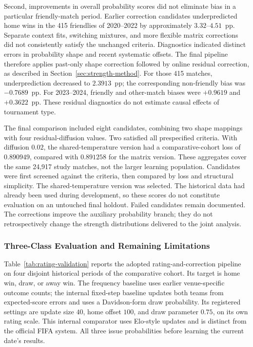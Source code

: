 Second, improvements in overall probability scores did not eliminate bias in a particular friendly-match period. Earlier correction candidates underpredicted home wins in the 415 friendlies of 2020--2022 by approximately $3.32$--$4.51$~pp. Separate context fits, switching mixtures, and more flexible matrix corrections did not consistently satisfy the unchanged criteria. Diagnostics indicated distinct errors in probability shape and recent systematic offsets. The final pipeline therefore applies past-only shape correction followed by online residual correction, as described in Section~\ref{sec:strength-method}. For those 415 matches, underprediction decreased to $2.3913$~pp; the corresponding non-friendly bias was $-0.7689$~pp. For 2023--2024, friendly and other-match biases were $+0.9619$ and $+0.3622$~pp. These residual diagnostics do not estimate causal effects of tournament type.

The final comparison included eight candidates, combining two shape mappings with four residual-diffusion values. Two satisfied all prespecified criteria. With diffusion $0.02$, the shared-temperature version had a comparative-cohort loss of $0.890949$, compared with $0.891258$ for the matrix version. These aggregates cover the same 24,917 study matches, not the larger learning population. Candidates were first screened against the criteria, then compared by loss and structural simplicity. The shared-temperature version was selected. The historical data had already been used during development, so these scores do not constitute evaluation on an untouched final holdout. Failed candidates remain documented. The corrections improve the auxiliary probability branch; they do not retrospectively change the strength distributions delivered to the joint analysis.

\subsubsection{Three-Class Evaluation and Remaining Limitations}

Table~\ref{tab:rating-validation} reports the adopted rating-and-correction pipeline on four disjoint historical periods of the comparative cohort. Its target is home win, draw, or away win. The frequency baseline uses earlier venue-specific outcome counts; the internal fixed-step baseline updates both teams from expected-score errors and uses a Davidson-form draw probability. Its registered settings are update size $40$, home offset $100$, and draw parameter $0.75$, on its own rating scale. This internal comparator uses Elo-style updates and is distinct from the official FIFA system. All three issue probabilities before learning the current date's results.

